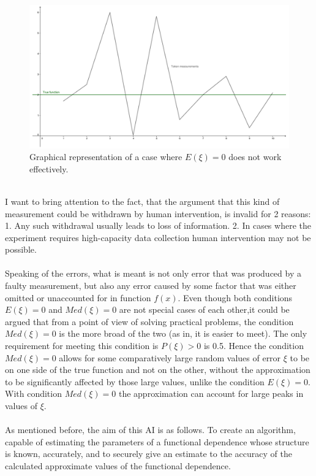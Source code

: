 \begin{figure}[h!]
\includegraphics[scale=0.1]{pic-naturallimits}
\centering
\caption{Graphical representation of a case where $E(\xi)=0$ does not work effectively.}
\label{fig:graph-nl}
\end{figure}
\\
I want to bring attention to the fact, that the argument that this kind of measurement could be withdrawn by human intervention, is invalid for 2 reasons: 1. Any such withdrawal usually leads to loss of information. 2. In cases where the experiment requires high-capacity data collection human intervention may not be possible.\\
\\
Speaking of the errors, what is meant is not only error that was produced by a faulty measurement, but also any error caused by some factor that was either omitted or unaccounted for in function $f(x)$. Even though both conditions $E(\xi)=0$ and $Med(\xi)=0$ are not special cases of each other,it could be argued that from a point of view of solving practical problems, the condition $Med(\xi)=0$ is the more broad of the two (as in, it is easier to meet). The only requirement for meeting this condition is $P(\xi)>0$ is 0.5.  Hence the condition $Med(\xi)=0$ allows for some comparatively large random values of error $\xi$ to be on one side of the true function and not on the other, without the approximation to be significantly affected by those large values, unlike the condition $E(\xi)=0$. With condition $Med(\xi)=0$ the approximation can account for large peaks in values of $\xi$.\\
\\
As mentioned before, the aim of this AI is as follows. To create an algorithm, capable of estimating the parameters of a functional dependence whose structure is known, accurately,  and to securely give an estimate to the accuracy of the calculated approximate values of the functional dependence. \\
